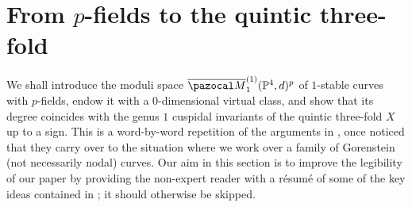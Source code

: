 \documentclass[11pt]{amsart}
\newcommand{\Mone}[3]{\overline{\pazocal M}^{(1)}_{#1}(#2,#3)}
\newcommand{\PP}{\mathbb P}
\theoremstyle{plain}
\theoremstyle{definition}
\newtheorem*{rem}{Remark}
\begin{document}

\section{From $p$-fields to the quintic three-fold}\label{section:p-fields}

We shall introduce the moduli space $\Mone{1}{\PP^4}{d}^p$ of $1$-stable curves with $p$-fields, endow it with a $0$-dimensional virtual class, and show that its degree coincides with the genus $1$ cuspidal invariants of the quintic three-fold $X$ up to a sign. This is a word-by-word repetition of the arguments in \cite{CLpfields}, once noticed that they carry over to the situation where we work over a family of Gorenstein (not necessarily nodal) curves. Our aim in this section is to improve the legibility of our paper by providing the non-expert reader with a r\'{e}sum\'{e} of some of the key ideas contained in \cite{CLpfields}; it should otherwise be skipped.
\end{document}
